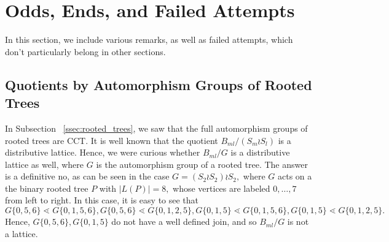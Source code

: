 \documentclass[10 pt]{amsart}
\theoremstyle{plain}
\theoremstyle{definition}
\theoremstyle{remark}
\numberwithin{equation}{section}
\newcommand\ssec{\subsection}
\begin{document}
\section{Odds, Ends, and Failed Attempts}

In this section, we include various remarks, as well as failed attempts, which don't particularly belong in other sections.

\ssec{Quotients by Automorphism Groups of Rooted Trees}

In Subsection ~\ref{ssec:rooted_trees}, we saw that the full automorphism groups of rooted trees are CCT. It is well known that the quotient $B_{ml}/(S_m\wr S_l)$ is a distributive lattice. Hence, we were curious whether $B_{ml}/G$ is a distributive lattice as well, where $G$ is the automorphism group of a rooted tree. The answer is a definitive no, as can be seen in the case $G = (S_2 \wr S_2) \wr S_2,$ where $G$ acts on a the binary rooted tree $P$ with $|L(P)| = 8,$ whose vertices are labeled $0,\ldots, 7$ from left to right. In this case, it is easy to see that $G\{0,5,6\} \lessdot G\{0,1,5,6\},G\{0,5,6\} \lessdot G\{0,1,2,5\},G\{0,1,5\} \lessdot G\{0,1,5,6\},G\{0,1,5\} \lessdot G\{0,1,2,5\}.$ Hence, $G\{0,5,6\},G\{0,1,5\}$ do not have a well defined join, and so $B_{ml}/G$ is not a lattice.
\end{document}
